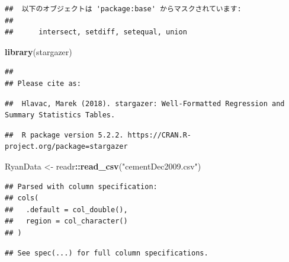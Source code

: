 \documentclass[]{book}
\newenvironment{Shaded}{\begin{snugshade}}{\end{snugshade}}
\newcommand{\KeywordTok}[1]{\textcolor[rgb]{0.13,0.29,0.53}{\textbf{#1}}}
\newcommand{\DataTypeTok}[1]{\textcolor[rgb]{0.13,0.29,0.53}{#1}}
\newcommand{\StringTok}[1]{\textcolor[rgb]{0.31,0.60,0.02}{#1}}
\newcommand{\OperatorTok}[1]{\textcolor[rgb]{0.81,0.36,0.00}{\textbf{#1}}}
\newcommand{\NormalTok}[1]{#1}
\begin{document}
\begin{verbatim}
##  以下のオブジェクトは 'package:base' からマスクされています: 
## 
##      intersect, setdiff, setequal, union
\end{verbatim}

\begin{Shaded}
\begin{Highlighting}[]
\KeywordTok{library}\NormalTok{(stargazer)}
\end{Highlighting}
\end{Shaded}

\begin{verbatim}
## 
## Please cite as:
\end{verbatim}

\begin{verbatim}
##  Hlavac, Marek (2018). stargazer: Well-Formatted Regression and Summary Statistics Tables.
\end{verbatim}

\begin{verbatim}
##  R package version 5.2.2. https://CRAN.R-project.org/package=stargazer
\end{verbatim}

\begin{Shaded}
\begin{Highlighting}[]
\NormalTok{RyanData <-}\StringTok{ }\NormalTok{readr}\OperatorTok{::}\KeywordTok{read_csv}\NormalTok{(}\StringTok{"cementDec2009.csv"}\NormalTok{)}
\end{Highlighting}
\end{Shaded}

\begin{verbatim}
## Parsed with column specification:
## cols(
##   .default = col_double(),
##   region = col_character()
## )
\end{verbatim}

\begin{verbatim}
## See spec(...) for full column specifications.
\end{verbatim}

\begin{Shaded}
\end{Shaded}
\end{document}
